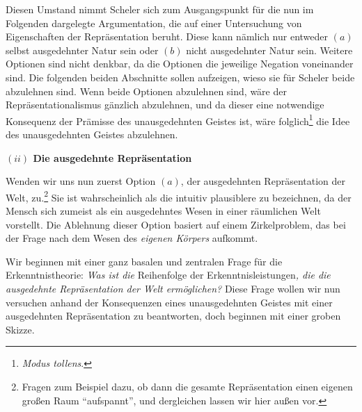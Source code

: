 \documentclass[a4paper, 12pt]{article}
\begin{document}
\begin{onehalfspace}
Diesen Umstand nimmt Scheler sich zum Ausgangspunkt für die nun im Folgenden dargelegte Argumentation, die auf einer Untersuchung von Eigenschaften der Repräsentation beruht. Diese kann nämlich nur entweder $(a)$ selbst ausgedehnter Natur sein oder $(b)$ nicht ausgedehnter Natur sein. Weitere Optionen sind nicht denkbar, da die Optionen die jeweilige Negation voneinander sind. Die folgenden beiden Abschnitte sollen aufzeigen, wieso sie für Scheler beide abzulehnen sind. Wenn beide Optionen abzulehnen sind, wäre der Repräsentationalismus gänzlich abzulehnen, und da dieser eine notwendige Konsequenz der Prämisse des unausgedehnten Geistes ist, wäre folglich\footnote{\emph{Modus tollens}.} die Idee des unausgedehnten Geistes abzulehnen.

\vspace{5mm}
\noindent\textbf{$(ii)$ Die ausgedehnte Repräsentation}


\noindent Wenden wir uns nun zuerst Option $(a)$, der ausgedehnten Repräsentation der Welt, zu.\footnote{Fragen zum Beispiel dazu, ob dann die gesamte Repräsentation einen eigenen großen Raum "`aufspannt"', und dergleichen lassen wir hier außen vor.} Sie ist wahrscheinlich als die intuitiv plausiblere zu bezeichnen, da der Mensch sich zumeist als ein ausgedehntes Wesen in einer räumlichen Welt vorstellt. Die Ablehnung dieser Option basiert auf einem Zirkelproblem, das bei der Frage nach dem Wesen des \emph{eigenen Körpers} aufkommt.


Wir beginnen mit einer ganz basalen und zentralen Frage für die Erkenntnistheorie: \emph{Was ist die} Reihenfolge der Erkenntnisleistungen\emph{, die die ausgedehnte Repräsentation der Welt ermöglichen?} Diese Frage wollen wir nun versuchen anhand der Konsequenzen eines unausgedehnten Geistes mit einer ausgedehnten Repräsentation zu beantworten, doch beginnen mit einer groben Skizze.


\end{onehalfspace}
\end{document}
